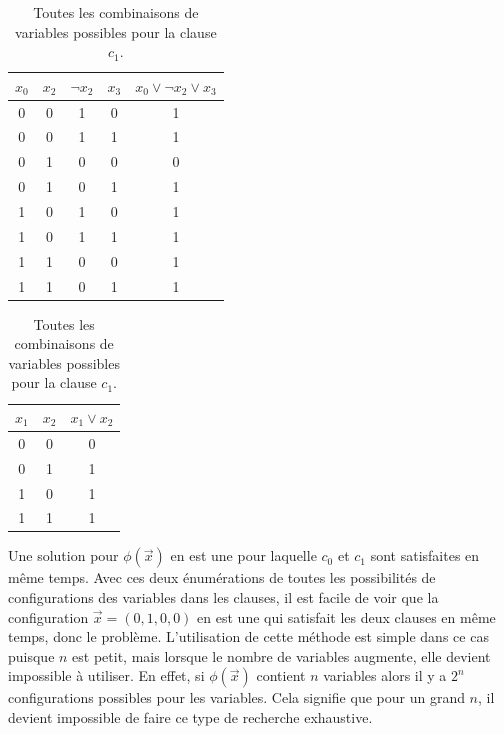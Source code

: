 \begin{table}[h]
    \parbox{.48\linewidth}{
        \centering
        \begin{tabular}{|c c c c||c|}
            \hline
            $x_0$ & $x_2$ & $\neg x_2$ & $x_3$ & $x_0 \vee \neg x_2 \vee x_3$ \\
            \hline
            0 & 0 & 1 & 0 & 1 \\
            \hline
            0 & 0 & 1 & 1 & 1 \\
            \hline
            0 & 1 & 0 & 0 & 0 \\
            \hline
            0 & 1 & 0 & 1 & 1 \\
            \hline
            1 & 0 & 1 & 0 & 1 \\
            \hline
            1 & 0 & 1 & 1 & 1 \\
            \hline
            1 & 1 & 0 & 0 & 1 \\
            \hline
            1 & 1 & 0 & 1 & 1 \\
            \hline
        \end{tabular}
        \caption{Toutes les combinaisons de variables possibles pour la clause $c_0$.}
        \label{table:c1}
    }
    \hfill
    \parbox{.48\linewidth}{
        \centering
        \begin{tabular}{|c c||c|}
            \hline
            $x_1$ & $x_2$ & $x_1 \vee x_2$ \\
            \hline
            0 & 0 & 0\\
            \hline
            0 & 1 & 1\\
            \hline
            1 & 0 & 1\\
            \hline
            1 & 1 & 1\\
            \hline
        \end{tabular}
        \caption{Toutes les combinaisons de variables possibles pour la clause $c_1$.}
        \label{table:c2}
    }
\end{table}
Une solution pour $\phi(\vec{x})$ en est une pour laquelle $c_0$ et $c_1$ sont satisfaites en même temps.
Avec ces deux énumérations de toutes les possibilités de configurations des variables dans les clauses, il est facile de voir que la configuration $\vec{x} = (0, 1, 0, 0)$ en est une qui satisfait les deux clauses en même temps, donc le problème.
L'utilisation de cette méthode est simple dans ce cas puisque $n$ est petit, mais lorsque le nombre de variables augmente, elle devient impossible à utiliser.
En effet, si $\phi(\vec{x})$ contient $n$ variables alors il y a $2^n$ configurations possibles pour les variables.
Cela signifie que pour un grand $n$, il devient impossible de faire ce type de recherche exhaustive.

